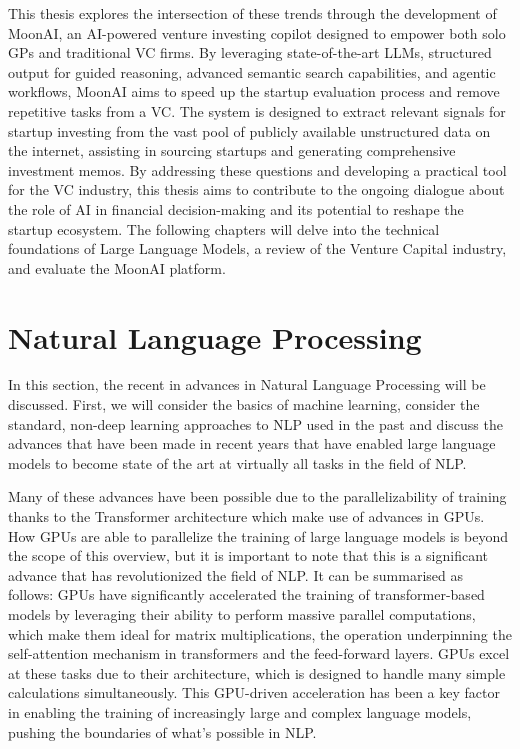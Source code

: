 \documentclass[a4paper, oneside]{discothesis}
\begin{document}
This thesis explores the intersection of these trends through the development of MoonAI, an
AI-powered venture investing copilot designed to empower both solo GPs and traditional VC firms.
By leveraging state-of-the-art LLMs, structured output for guided reasoning, advanced
semantic search capabilities, and agentic workflows, MoonAI aims to speed up the startup evaluation process and remove repetitive tasks from a VC. The
system is designed to extract relevant signals for startup investing from the vast pool of
publicly available unstructured data on the internet, assisting in sourcing startups and
generating comprehensive investment memos. By addressing these questions and developing a practical tool for the VC industry, this thesis
aims to contribute to the ongoing dialogue about the role of AI in financial decision-making and
its potential to reshape the startup ecosystem. The following chapters will delve into the
technical foundations of Large Language Models, a review of the Venture Capital industry, and evaluate the MoonAI platform. 

\chapter{Natural Language Processing}

In this section, the recent in advances in Natural Language Processing will be discussed. First, we will consider the basics of machine learning, 
consider the standard, non-deep learning approaches to NLP used in the past and discuss the advances that have been made in recent years that have enabled large language models to become state of the art at virtually all tasks in the field of NLP.

Many of these advances have been possible due to the parallelizability of training thanks to the Transformer architecture which make use of advances in GPUs. How GPUs are able to parallelize the training of large language models is beyond the scope of this overview, but it is important to note that this is a significant advance that has revolutionized the field of NLP. It can be summarised as follows: GPUs have significantly accelerated the training of transformer-based models by leveraging their ability to perform massive parallel computations, which make them ideal for matrix multiplications, the operation underpinning the self-attention mechanism in transformers and the feed-forward layers. 
GPUs excel at these tasks due to their architecture, which is designed to handle many simple calculations simultaneously.
This GPU-driven acceleration has been a key factor in enabling the training of increasingly large and complex language models, pushing the boundaries of what's possible in NLP.
\end{document}
